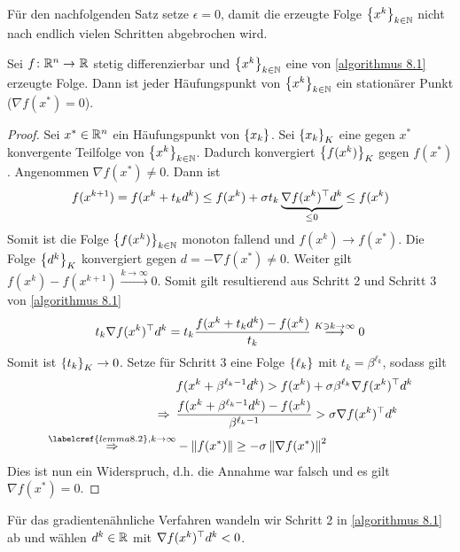 Für den nachfolgenden Satz setze $\epsilon = 0$, damit die erzeugte Folge $\folge[k \in \N]{x^k}$ nicht nach endlich vielen Schritten abgebrochen wird.

\begin{satz}
	Sei $\abb{f}{\Rn}{\R}$ stetig differenzierbar und $\folge[k \in \N]{x^k}$ eine von \cref{algorithmus 8.1} erzeugte Folge. Dann ist jeder Häufungspunkt von $\folge[k \in \N]{x^k}$ ein stationärer Punkt ($\nabla f(x^\ast) = 0$).
\end{satz}
\begin{proof}
	Sei $x^\ast \in \Rn$ ein Häufungspunkt von $\folge{x_k}$. Sei $\folge[K]{x_k}$ eine gegen $x^\ast$ konvergente Teilfolge von $\folge[k \in \N]{x^k}$. Dadurch konvergiert $\folge[K]{f(x^k)}$ gegen $f(x^\ast)$. Angenommen $\nabla f(x^\ast) \neq 0$. Dann ist
	\begin{equation*}
		f(x^{k+1}) = f(x^k + t_k d^k) \le f(x^k) + \sigma t_k \underbrace{\nabla \trans{f(x^k)} d^k}_{\le 0} \le f(x^k)
	\end{equation*}
	Somit ist die Folge $\folge[k \in \N]{f(x^k)}$ monoton fallend und $f(x^k) \to f(x^\ast)$. Die Folge $\folge[K]{d^k}$ konvergiert gegen $d = - \nabla f(x^\ast) \neq 0$. Weiter gilt $f(x^k) - f(x^{k+1}) \overset{k \to \infty}{\longrightarrow} 0$. Somit gilt resultierend aus Schritt 2 und Schritt 3 von \cref{algorithmus 8.1} 
	\begin{equation*}
		t_k \nabla \trans{f(x^k)} d^k = t_k \frac{f(x^k + t_k d^k) - f(x^k)}{t_k} \overset{K \ni k \to \infty}{\longrightarrow} 0
	\end{equation*}
	Somit ist $\folge[K]{t_k} \to 0$. Setze für Schritt 3 eine Folge $\folge{\ell_k}$ mit $t_k = \beta^{\ell_k}$, sodass gilt
	\begin{align*}
		&f(x^k + \beta^{\ell_k - 1} d^k) > f(x^k) + \sigma \beta^{\ell_k} \nabla \trans{f(x^k)} d^k \\
		\follows &\frac{f(x^k + \beta^{\ell_k -1} d^k) - f(x^k)}{\beta^{\ell_k - 1}} > \sigma \nabla \trans{f(x^k)} d^k \\
		\overset{\labelcref{lemma 8.2}, k \to \infty}{\follows} &- \norm{f(x^\ast)} \ge - \sigma \norm{\nabla f(x^\ast)}^2
	\end{align*}
	Dies ist nun ein Widerspruch, d.h. die Annahme war falsch und es gilt $\nabla f(x^\ast) = 0$.
\end{proof}

\begin{algorithmus} \label{algorithmus 8.5}
	Für das gradientenähnliche Verfahren wandeln wir Schritt 2 in \cref{algorithmus 8.1} ab und wählen $d^k \in \R$ mit $\nabla \trans{f(x^k)} d^k < 0$.
\end{algorithmus}

